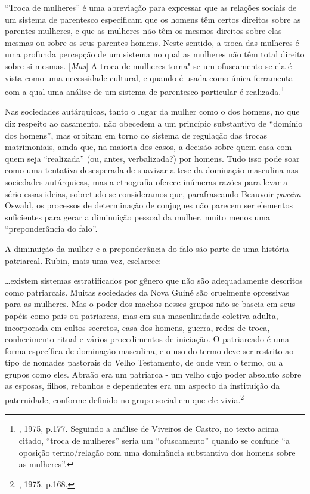 ``Troca de mulheres'' é uma abreviação para expressar que as relações
sociais de um sistema de parentesco especificam que os homens têm certos
direitos sobre as parentes mulheres, e que as mulheres não têm os mesmos
direitos sobre elas mesmas ou sobre os seus parentes homens. Neste
sentido, a troca das mulheres é uma profunda percepção de um sistema no
qual as mulheres não têm total direito sobre si mesmas. {[}\emph{Mas}{]}
A troca de mulheres torna"-se um ofuscamento se ela é vista como uma
necessidade cultural, e quando é usada como única ferramenta com a qual
uma análise de um sistema de parentesco particular é
realizada.\footnote{, 1975, p.177. Seguindo a análise de Viveiros
  de Castro, no texto acima citado, ``troca de mulheres'' seria um
  ``ofuscamento'' quando se confude ``a oposição termo/relação com uma
  dominância substantiva dos homens sobre as mulheres''.}

Nas sociedades autárquicas, tanto o lugar da mulher como o dos homens,
no que diz respeito ao casamento, não obecedem a um princípio
substantivo de ``domínio dos homens'', mas orbitam em torno do sistema
de regulação das trocas matrimoniais, ainda que, na maioria dos casos, a
decisão sobre quem casa com quem seja ``realizada'' (ou, antes,
verbalizada?) por homens. Tudo isso pode soar como uma tentativa
desesperada de suavizar a tese da dominação masculina nas sociedades
autárquicas, mas a etnografia oferece inúmeras razões para levar a sério
essas ideias, sobretudo se consideramos que, parafraseando Beauvoir
\emph{passim} Oswald, os processos de determinação de conjugues não
parecem ser elementos suficientes para gerar a diminuição pessoal da
mulher, muito menos uma ``preponderância do falo''.

A diminuição da mulher e a preponderância do falo são parte de uma
história patriarcal. Rubin, mais uma vez, esclarece:

\ldots{}existem sistemas estratificados por gênero que não são adequadamente
descritos como patriarcais. Muitas sociedades da Nova Guiné são
cruelmente opressivas para as mulheres. Mas o poder dos machos nesses
grupos não se baseia em seus papéis como pais ou patriarcas, mas em sua
masculinidade coletiva adulta, incorporada em cultos secretos, casa dos
homens, guerra, redes de troca, conhecimento ritual e vários
procedimentos de iniciação. O patriarcado é uma forma específica de
dominação masculina, e o uso do termo deve ser restrito ao tipo de
nomades pastorais do Velho Testamento, de onde vem o termo, ou a grupos
como eles. Abraão era um patriarca - um velho cujo poder absoluto sobre
as esposas, filhos, rebanhos e dependentes era um aspecto da instituição
da paternidade, conforme definido no grupo social em que ele
vivia.\footnote{, 1975, p.168.}

